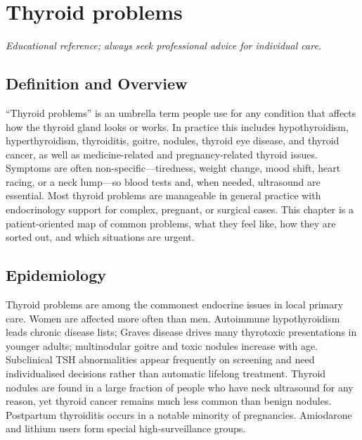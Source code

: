 \chapter{Thyroid problems}

\medskip
\noindent\textit{Educational reference; always seek professional advice for individual care.}

\section*{Definition and Overview}
``Thyroid problems'' is an umbrella term people use for any condition that affects how the thyroid gland looks or works. In practice this includes hypothyroidism, hyperthyroidism, thyroiditis, goitre, nodules, thyroid eye disease, and thyroid cancer, as well as medicine-related and pregnancy-related thyroid issues. Symptoms are often non-specific---tiredness, weight change, mood shift, heart racing, or a neck lump---so blood tests and, when needed, ultrasound are essential. Most thyroid problems are manageable in general practice with endocrinology support for complex, pregnant, or surgical cases. This chapter is a patient-oriented map of common problems, what they feel like, how they are sorted out, and which situations are urgent.

\section*{Epidemiology}
Thyroid problems are among the commonest endocrine issues in local primary care. Women are affected more often than men. Autoimmune hypothyroidism leads chronic disease lists; Graves disease drives many thyrotoxic presentations in younger adults; multinodular goitre and toxic nodules increase with age. Subclinical TSH abnormalities appear frequently on screening and need individualised decisions rather than automatic lifelong treatment. Thyroid nodules are found in a large fraction of people who have neck ultrasound for any reason, yet thyroid cancer remains much less common than benign nodules. Postpartum thyroiditis occurs in a notable minority of pregnancies. Amiodarone and lithium users form special high-surveillance groups.

